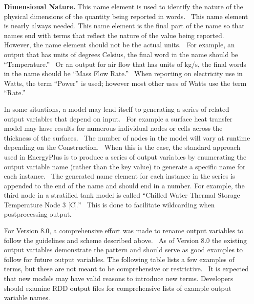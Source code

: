 \textbf{Dimensional Nature.} This name element is used to identify the nature of the physical dimensions of the quantity being reported in words.~ This name element is nearly always needed. This name element is the final part of the name so that names end with terms that reflect the nature of the value being reported. However, the name element should not be the actual units.~ For example, an output that has units of degrees Celsius, the final word in the name should be ``Temperature.''~ Or an output for air flow that has units of kg/s, the final words in the name should be ``Mass Flow Rate.''~ When reporting on electricity use in Watts, the term ``Power'' is used; however most other uses of Watts use the term ``Rate.''

In some situations, a model may lend itself to generating a series of related output variables that depend on input.~ For example a surface heat transfer model may have results for numerous individual nodes or cells across the thickness of the surfaces.~ The number of nodes in the model will vary at runtime depending on the Construction.~ When this is the case, the standard approach used in EnergyPlus is to produce a series of output variables by enumerating the output variable name (rather than the key value) to generate a specific name for each instance.~ The generated name element for each instance in the series is appended to the end of the name and should end in a number. For example, the third node in a stratified tank model is called ``Chilled Water Thermal Storage Temperature Node 3 {[}C{]}.''~ This is done to facilitate wildcarding when postprocessing output.

For Version 8.0, a comprehensive effort was made to rename output variables to follow the guidelines and scheme described above.~ As of Version 8.0 the existing output variables demonstrate the pattern and should serve as good examples to follow for future output variables. The following table lists a few examples of terms, but these are not meant to be comprehensive or restrictive.~ It is expected that new models may have valid reasons to introduce new terms. Developers should examine RDD output files for comprehensive lists of example output variable names.

